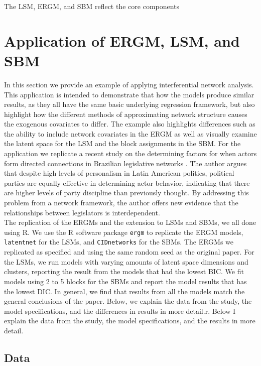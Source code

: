 \documentclass[fleqn,12pt]{wlscirep}
\begin{document}
The LSM, ERGM, and SBM reflect the core components

\section{Application of ERGM, LSM, and SBM}
In this section we provide an example of applying interferential network analysis. This application is intended to demonstrate that how the models produce similar results, as they all have the same basic underlying regression framework, but also highlight how the different methods of approximating network structure causes the exogenous covariates to differ. The example also highlights differences such as the ability to include network covariates in the ERGM as well as visually examine the latent space for the LSM and the block assignments in the SBM. For the application we replicate a recent study on the determining factors for when actors form directed connections in Brazilian legislative networks \citep{wojcik2017legislative}. The author argues that despite high levels of personalism in Latin American politics, political parties are equally effective in determining actor behavior, indicating that there are higher levels of party discipline than previously thought. By addressing this problem from a network framework, the author offers new evidence that the relationships between legislators is interdependent.\\

The replication of the ERGMs and the extension to LSMs and SBMs, we all done using R. We use the R software package \texttt{ergm} to replicate the ERGM models, \texttt{latentnet} for the LSMs, and \texttt{CIDnetworks} for the SBMs. The ERGMs we replicated as specified and using the same random seed as the original paper. For the LSMs, we run models with varying amounts of latent space dimensions and clusters, reporting the result from the models that had the lowest BIC. We fit models using 2 to 5 blocks for the SBMs and report the model results that has the lowest DIC. In general, we find that results from all the models match the general conclusions of the paper. Below, we explain the data from the study, the model specifications, and the differences in results in more detail.r. Below I explain the data from the study, the model specifications, and the results in more detail.

\subsection{Data}
\end{document}
